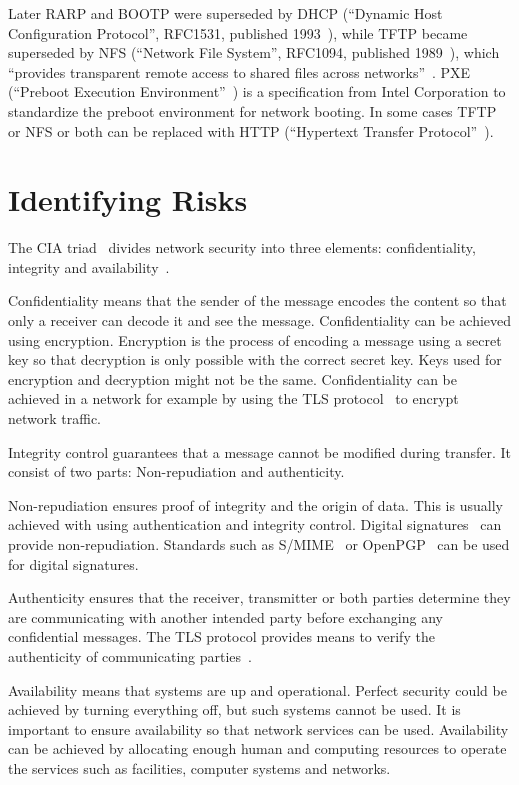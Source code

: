 Later RARP and BOOTP were superseded by DHCP (``Dynamic Host
Configuration Protocol'', RFC1531, published 1993~\cite{RFC1531}),
while TFTP became superseded by NFS (``Network File System'', RFC1094,
published 1989~\cite{RFC1094}), which ``provides transparent remote
access to shared files across networks''~\cite{RFC1094}. PXE
(``Preboot Execution Environment''~\cite{PXEspec}) is a specification
from Intel Corporation to standardize the preboot environment for
network booting. In some cases TFTP or NFS or both can be replaced
with HTTP (``Hypertext Transfer
Protocol''~\cite{RFC1945}\cite{RFC2616}).


\section{Identifying Risks}

The CIA triad~\cite{cia-triad} divides network security into three
elements: confidentiality, integrity and availability~\cite{anderson}.

Confidentiality means that the sender of the message encodes the
content so that only a receiver can decode it and see the
message. Confidentiality can be achieved using encryption. Encryption
is the process of encoding a message using a secret key so that
decryption is only possible with the correct secret key. Keys used for
encryption and decryption might not be the same. Confidentiality can
be achieved in a network for example by using the TLS
protocol~\cite{RFC5246} to encrypt network traffic.

Integrity control guarantees that a message cannot be modified during
transfer. It consist of two parts: Non-repudiation and authenticity.

Non-repudiation ensures proof of integrity and the origin of
data. This is usually achieved with using authentication and integrity
control. Digital signatures~\cite{Diffie2006}\cite{Goldwasser1988} can
provide non-repudiation. Standards such as S/MIME~\cite{RFC5751} or
OpenPGP~\cite{RFC4880} can be used for digital signatures.

Authenticity ensures that the receiver, transmitter or both parties
determine they are communicating with another intended party before
exchanging any confidential messages. The TLS protocol provides means
to verify the authenticity of communicating parties~\cite{RFC5246}.

Availability means that systems are up and operational. Perfect
security could be achieved by turning everything off, but such systems
cannot be used. It is important to ensure availability so that network
services can be used. Availability can be achieved by allocating
enough human and computing resources to operate the services such as
facilities, computer systems and networks.

